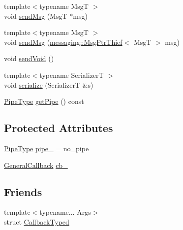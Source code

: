 \begin{DoxyCompactItemize}
{\footnotesize template$<$typename MsgT $>$ }\\void \hyperlink{structvt_1_1pipe_1_1callback_1_1cbunion_1_1_callback_raw_base_single_a6c2172d17e709df20b797dabcd339785}{send\+Msg} (MsgT $\ast$msg)
\item 
{\footnotesize template$<$typename MsgT $>$ }\\void \hyperlink{structvt_1_1pipe_1_1callback_1_1cbunion_1_1_callback_raw_base_single_a00c44780961d5d7e0085321872f5e805}{send\+Msg} (\hyperlink{structvt_1_1messaging_1_1_msg_ptr_thief}{messaging\+::\+Msg\+Ptr\+Thief}$<$ MsgT $>$ msg)
\item 
void \hyperlink{structvt_1_1pipe_1_1callback_1_1cbunion_1_1_callback_raw_base_single_abc038ad02640796e9074fbb89b932403}{send\+Void} ()
\item 
{\footnotesize template$<$typename SerializerT $>$ }\\void \hyperlink{structvt_1_1pipe_1_1callback_1_1cbunion_1_1_callback_raw_base_single_afee30505e0bcec590b9675f93b44eadc}{serialize} (SerializerT \&s)
\item 
\hyperlink{namespacevt_ac9852acda74d1896f48f406cd72c7bd3}{Pipe\+Type} \hyperlink{structvt_1_1pipe_1_1callback_1_1cbunion_1_1_callback_raw_base_single_a3422df77d381724e530631720ec9720b}{get\+Pipe} () const
\end{DoxyCompactItemize}
\subsection*{Protected Attributes}
\begin{DoxyCompactItemize}
\item 
\hyperlink{namespacevt_ac9852acda74d1896f48f406cd72c7bd3}{Pipe\+Type} \hyperlink{structvt_1_1pipe_1_1callback_1_1cbunion_1_1_callback_raw_base_single_a7cff39d219279b2075d7db56e6b87944}{pipe\+\_\+} = no\+\_\+pipe
\item 
\hyperlink{structvt_1_1pipe_1_1callback_1_1cbunion_1_1_general_callback}{General\+Callback} \hyperlink{structvt_1_1pipe_1_1callback_1_1cbunion_1_1_callback_raw_base_single_a6535ef3d7baf0130dcf2c23f63496f3d}{cb\+\_\+}
\end{DoxyCompactItemize}
\subsection*{Friends}
\begin{DoxyCompactItemize}
\item 
{\footnotesize template$<$typename... Args$>$ }\\struct \hyperlink{structvt_1_1pipe_1_1callback_1_1cbunion_1_1_callback_raw_base_single_a983194428523f2cd409417e221cc51c3}{Callback\+Typed}
\end{DoxyCompactItemize}


